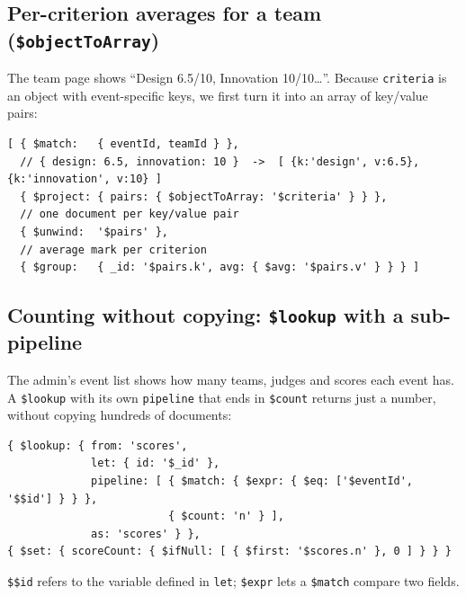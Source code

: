 \documentclass[11pt,a4paper]{article}
\newcommand{\op}[1]{\texttt{\$#1}}
\begin{document}
\subsection{Per-criterion averages for a team (\op{objectToArray})}
The team page shows ``Design 6.5/10, Innovation 10/10\dots''. Because \texttt{criteria} is an object with
event-specific keys, we first turn it into an array of key/value pairs:
\begin{lstlisting}
[ { $match:   { eventId, teamId } },
  // { design: 6.5, innovation: 10 }  ->  [ {k:'design', v:6.5}, {k:'innovation', v:10} ]
  { $project: { pairs: { $objectToArray: '$criteria' } } },
  // one document per key/value pair
  { $unwind:  '$pairs' },
  // average mark per criterion
  { $group:   { _id: '$pairs.k', avg: { $avg: '$pairs.v' } } } ]
\end{lstlisting}

\subsection{Counting without copying: \op{lookup} with a sub-pipeline}
The admin's event list shows how many teams, judges and scores each event has. A \op{lookup} with its own
\texttt{pipeline} that ends in \op{count} returns just a number, without copying hundreds of documents:
\begin{lstlisting}
{ $lookup: { from: 'scores',
             let: { id: '$_id' },
             pipeline: [ { $match: { $expr: { $eq: ['$eventId', '$$id'] } } },
                         { $count: 'n' } ],
             as: 'scores' } },
{ $set: { scoreCount: { $ifNull: [ { $first: '$scores.n' }, 0 ] } } }
\end{lstlisting}
\texttt{\$\$id} refers to the variable defined in \texttt{let}; \op{expr} lets a \op{match} compare two fields.
\end{document}
